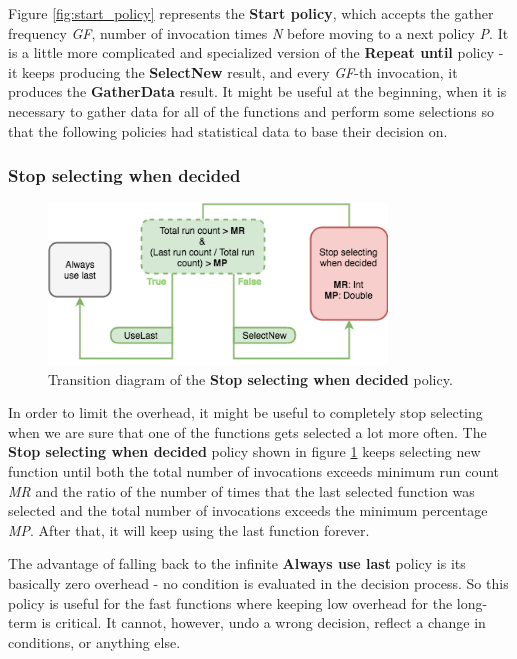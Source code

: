 Figure \ref{fig:start_policy} represents the \textbf{Start policy}, which accepts the gather frequency \textit{GF}, number of invocation times \textit{N} before moving to a next policy \textit{P}. It is a little more complicated and specialized version of the \textbf{Repeat until} policy - it keeps producing the \textbf{SelectNew} result, and every \textit{GF}-th invocation, it produces the \textbf{GatherData} result. It might be useful at the beginning, when it is necessary to gather data for all of the functions and perform some selections so that the following policies had statistical data to base their decision on.

\subsubsection{Stop selecting when decided}

\begin{figure}[h!]
	\captionsetup{justification=centering,margin=0.5cm}
	\centerline{\mbox{\includegraphics[width=90mm]{./img/stop_selecting_when_decided.png}}}
	\caption{Transition diagram of the \textbf{Stop selecting  when decided} policy.}
	\label{fig:stop_selecting_when_decided}
\end{figure}

In order to limit the overhead, it might be useful to completely stop selecting when we are sure that one of the functions gets selected a lot more often. The \textbf{Stop selecting when decided} policy shown in figure \ref{fig:stop_selecting_when_decided} keeps selecting new function until both the total number of invocations exceeds minimum run count \textit{MR} and the ratio of the number of times that the last selected function was selected and the total number of invocations exceeds the minimum percentage \textit{MP}. After that, it will keep using the last function forever. 

The advantage of falling back to the infinite \textbf{Always use last} policy is its basically zero overhead - no condition is evaluated in the decision process. So this policy is useful for the fast functions where keeping low overhead for the long-term is critical. It cannot, however, undo a wrong decision, reflect a change in conditions, or anything else.

